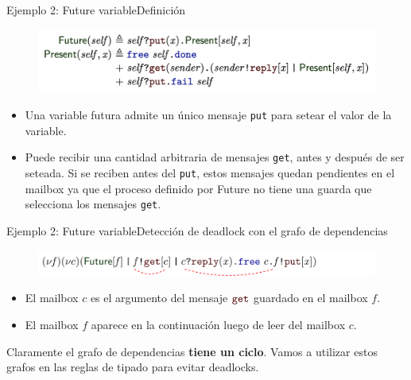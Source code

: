 \documentclass{beamer}
\newcommand{\msgtag}[1]{\texttt{\textcolor{msg-color}{#1}}}
\begin{document}
\begin{frame}{Ejemplo 2: Future variable}{Definición}
    \begin{figure}[H]
        \includegraphics[width=\textwidth]{example2-future}
    \end{figure}

    \begin{itemize}
        \item Una variable futura admite un único mensaje \msgtag{put} para setear el valor de la variable.
        \item Puede recibir una cantidad arbitraria de mensajes \msgtag{get}, antes y después de ser seteada. Si se reciben antes del \msgtag{put}, estos mensajes quedan pendientes en el mailbox ya que el proceso definido por Future no tiene una guarda que selecciona los mensajes \msgtag{get}.
    \end{itemize}
\end{frame}

\begin{frame}{Ejemplo 2: Future variable}{Detección de deadlock con el grafo de dependencias}
    \begin{figure}[H]
        \includegraphics[width=\textwidth]{dependency-graph-example}
    \end{figure}

    \begin{itemize}
        \item El mailbox $c$ es el argumento del mensaje $\msgtag{get}$ guardado en el mailbox $f$.
        \item El mailbox $f$ aparece en la continuación luego de leer del mailbox $c$.
    \end{itemize}

    \vspace{-1em}
    \begin{figure}
        \centering
    \end{figure}
    \vspace{-1em}

    Claramente el grafo de dependencias \textbf{tiene un ciclo}. Vamos a utilizar estos grafos en las reglas de tipado para evitar deadlocks.
\end{frame}
\end{document}
